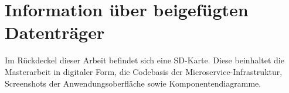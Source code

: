 \chapter{Information über beigefügten Datenträger}
\label{chap:informationueberbeigefuegtendatentraeger}
Im Rückdeckel dieser Arbeit befindet sich eine SD-Karte. Diese beinhaltet
die Masterarbeit in digitaler Form, die Codebasis der Microservice-Infrastruktur,
Screenshots der Anwendungsoberfläche sowie Komponentendiagramme.
